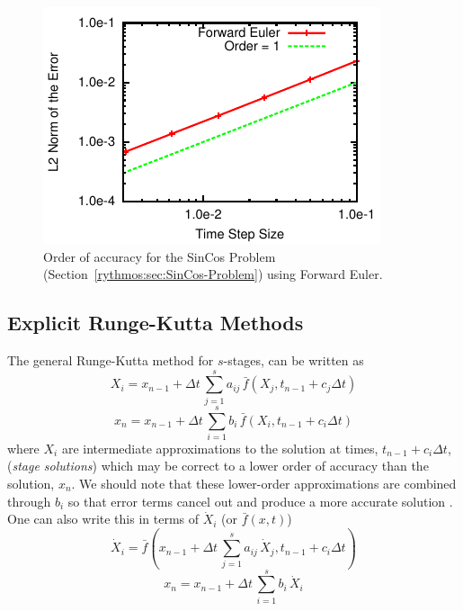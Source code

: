 \begin{figure}[H]
\centering{}\includegraphics[scale=1.5]{figures/ForwardEuler}\caption{Order of accuracy for the SinCos Problem (Section~\ref{rythmos:sec:SinCos-Problem})
using Forward Euler.\label{rythmos:fig:OrderofAccuracy-ForwardEuler}}
\end{figure}



\subsection{Explicit Runge-Kutta Methods\label{rythmos:sec:Explicit-Runge-Kutta-Methods}}

The general Runge-Kutta method for $s$-stages, can be written as
\[
X_{i}=x_{n-1}+\Delta t\,\sum_{j=1}^{s}a_{ij}\,\bar{f}(X_{j},t_{n-1}+c_{j}\Delta t)
\]
\[
x_{n}=x_{n-1}+\Delta t\,\sum_{i=1}^{s}b_{i}\,\bar{f}(X_{i},t_{n-1}+c_{i}\Delta t)
\]
where $X_{i}$ are intermediate approximations to the solution at
times, $t_{n-1}+c_{i}\Delta t$, (\emph{stage solutions}) which may
be correct to a lower order of accuracy than the solution, $x_{n}$.
We should note that these lower-order approximations are combined
through $b_{i}$ so that error terms cancel out and produce a more
accurate solution \cite[p. 80]{AscherPetzold}. One can also write
this in terms of $\dot{X}_{i}$ (or $\bar{f}(x,t)$)
\[
\dot{X}_{i}=\bar{f}\left(x_{n-1}+\Delta t\,\sum_{j=1}^{s}a_{ij}\,\dot{X}_{j},t_{n-1}+c_{i}\Delta t\right)
\]
\[
x_{n}=x_{n-1}+\Delta t\,\sum_{i=1}^{s}b_{i}\,\dot{X}_{i}
\]


